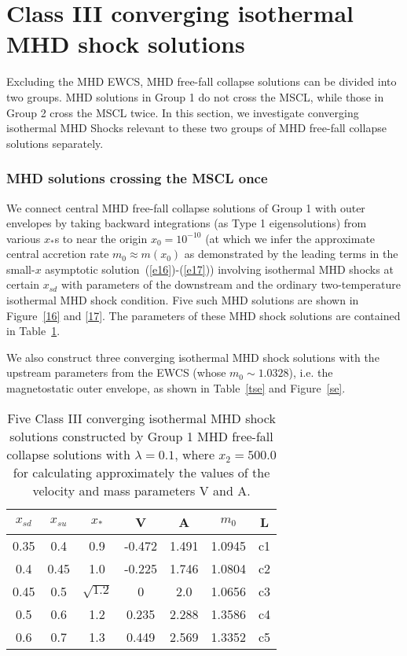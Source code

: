 \documentclass[fleqn,usenatbib]{mnras}
\begin{document}
\section{Class III converging isothermal MHD shock solutions}
\label{a4}


Excluding the MHD EWCS, MHD free-fall collapse solutions can be divided into two groups. MHD solutions in Group 1 do not cross the MSCL, while those in Group 2 cross the MSCL twice. In this section, we investigate converging isothermal MHD Shocks relevant to these two groups of MHD free-fall collapse solutions separately.  

\subsubsection{MHD solutions crossing the MSCL once}
\label{s5.3.1}
We connect central MHD free-fall collapse solutions of Group 1 with outer envelopes by taking backward integrations (as Type 1 eigensolutions) from various $x_{*}$s to near the origin $x_{0}=10^{-10}$ (at which we infer the approximate central accretion rate $m_{0}\approx m(x_{0})$ as demonstrated by the leading terms in the small-$x$ asymptotic solution~(\ref{e16})-(\ref{e17})) involving isothermal MHD shocks at certain $x_{sd}$ with parameters of the downstream and the ordinary two-temperature isothermal MHD shock condition. Five such MHD solutions are shown in Figure~\ref{16} and \ref{17}. The parameters of these MHD shock solutions are contained in Table~\ref{t4}.

We also construct three converging isothermal MHD shock solutions with the upstream parameters from the EWCS (whose $m_{0}\sim 1.0328$), i.e. the magnetostatic outer envelope, as shown in Table~\ref{tse} and Figure~\ref{se}. 

\begin{table}
\centering
\caption{Five Class III converging isothermal MHD shock solutions constructed by Group 1 MHD free-fall collapse solutions with $\lambda=0.1$, where $x_{2}=500.0$ for calculating approximately the values of the velocity and mass parameters V and A.}
\begin{tabular}{ccccccc}
\hline
$x_{sd}$ & $x_{su}$ & $x_{*}$ & V & A & $m_{0}$ & L\\
\hline
0.35 & 0.4 & 0.9 & -0.472 & 1.491 & 1.0945 & c1\\
0.4 & 0.45 & 1.0 & -0.225 & 1.746 & 1.0804 & c2\\
0.45 & 0.5 & $\sqrt{1.2}$ & 0 & 2.0 & 1.0656 & c3\\
0.5 & 0.6 & 1.2 & 0.235 & 2.288 & 1.3586 & c4\\
0.6 & 0.7 & 1.3 & 0.449 & 2.569 & 1.3352 & c5\\
\hline
\end{tabular}
\label{t4}
\end{table}
\end{document}
